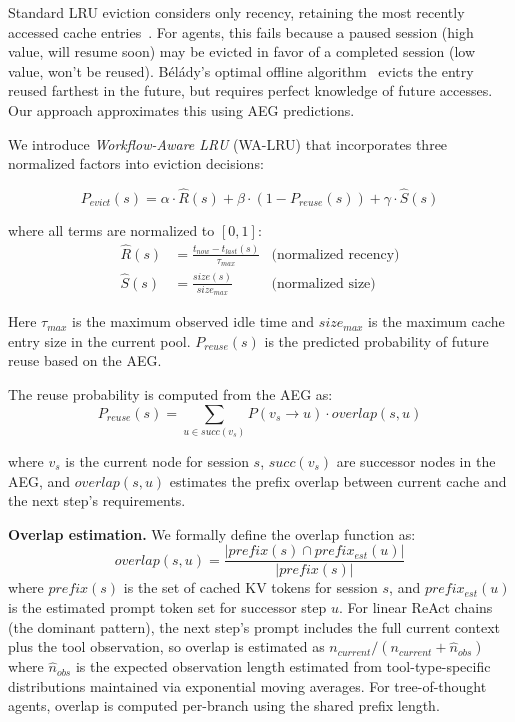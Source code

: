 \documentclass[sigconf]{acmart}
\begin{document}
Standard LRU eviction considers only recency, retaining the most recently accessed cache entries~\cite{sleator1985amortized}. For agents, this fails because a paused session (high value, will resume soon) may be evicted in favor of a completed session (low value, won't be reused). B\'{e}l\'{a}dy's optimal offline algorithm~\cite{belady1966replacement} evicts the entry reused farthest in the future, but requires perfect knowledge of future accesses. Our approach approximates this using AEG predictions.

We introduce \emph{Workflow-Aware LRU} (WA-LRU) that incorporates three normalized factors into eviction decisions:

\begin{equation}
    P_{evict}(s) = \alpha \cdot \hat{R}(s) + \beta \cdot (1 - P_{reuse}(s)) + \gamma \cdot \hat{S}(s)
    \label{eq:eviction}
\end{equation}

where all terms are normalized to $[0,1]$:
\begin{align}
    \hat{R}(s) &= \frac{t_{now} - t_{last}(s)}{\tau_{max}} &\text{(normalized recency)} \label{eq:recency}\\
    \hat{S}(s) &= \frac{size(s)}{size_{max}} &\text{(normalized size)} \label{eq:size}
\end{align}

Here $\tau_{max}$ is the maximum observed idle time and $size_{max}$ is the maximum cache entry size in the current pool. $P_{reuse}(s)$ is the predicted probability of future reuse based on the AEG.

The reuse probability is computed from the AEG as:
\begin{equation}
    P_{reuse}(s) = \sum_{u \in succ(v_s)} P(v_s \rightarrow u) \cdot overlap(s, u)
    \label{eq:reuse}
\end{equation}

where $v_s$ is the current node for session $s$, $succ(v_s)$ are successor nodes in the AEG, and $overlap(s, u)$ estimates the prefix overlap between current cache and the next step's requirements.

\textbf{Overlap estimation.} We formally define the overlap function as:
\begin{equation}
    overlap(s, u) = \frac{|prefix(s) \cap prefix_{est}(u)|}{|prefix(s)|}
    \label{eq:overlap}
\end{equation}
where $prefix(s)$ is the set of cached KV tokens for session $s$, and $prefix_{est}(u)$ is the estimated prompt token set for successor step $u$. For linear ReAct chains (the dominant pattern), the next step's prompt includes the full current context plus the tool observation, so overlap is estimated as $n_{current} / (n_{current} + \hat{n}_{obs})$ where $\hat{n}_{obs}$ is the expected observation length estimated from tool-type-specific distributions maintained via exponential moving averages. For tree-of-thought agents, overlap is computed per-branch using the shared prefix length.
\end{document}
